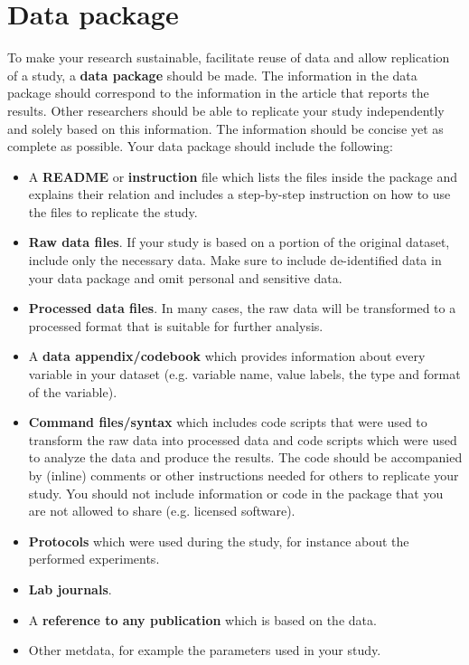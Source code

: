 \section{Data package}
To make your research sustainable, facilitate reuse of data and allow replication of a study, a \textbf{data package} should be made. The information in the data package should correspond to the information in the article that reports the results. Other researchers should be able to replicate your study independently and solely based on this information. The information should be concise yet as complete as possible.
\whiteline
Your data package should include the following:
\whiteline
\begin{itemize}
	\item A \textbf{README} or \textbf{instruction} file which lists the files inside the package and explains their relation and includes a step-by-step instruction on how to use the files to replicate the study.
	\item \textbf{Raw data files}. If your study is based on a portion of the original dataset, include only the necessary data. Make sure to include de-identified data in your data package and omit personal and sensitive data.
	\item \textbf{Processed data files}. In many cases, the raw data will be transformed to a processed format that is suitable for further analysis.
	\item A \textbf{data appendix/codebook} which provides information about every variable in your dataset (e.g. variable name, value labels, the type and format of the variable).
	\item \textbf{Command files/syntax} which includes code scripts that were used to transform the raw data into processed data and code scripts which were used to analyze the data and produce the results. The code should be accompanied by (inline) comments or other instructions needed for others to replicate your study. You should not include information or code in the package that you are not allowed to share (e.g. licensed software).
	\item \textbf{Protocols} which were used during the study, for instance about the performed experiments.
	\item \textbf{Lab journals}.
	\item A \textbf{reference to any publication} which is based on the data.
	\item Other metdata, for example the parameters used in your study.
\end{itemize}
	
